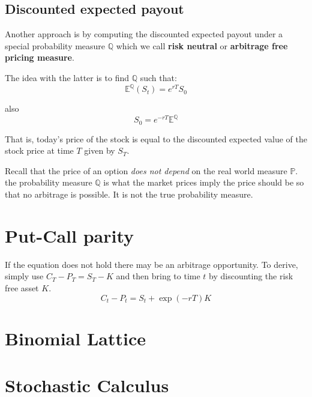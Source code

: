 \documentclass{article}
\begin{document}
\subsection{Discounted expected payout}
Another approach is by computing the discounted expected payout under a special probability measure $\mathbb{Q}$ which we call \textbf{risk neutral} or \textbf{arbitrage free pricing measure}.

The idea with the latter is to find $\mathbb{Q}$ such that:
\[ \mathbb{E}^{\mathbb{Q}}(S_t) = e^{rT}S_0 \]

also 
\[S_0 = e^{-rT}\mathbb{E}^{\mathbb{Q}}\]

That is, today's price of the stock is equal to the discounted expected value of the stock price at time $T$ given by $S_T$.


Recall that the price of an option \textit{does not depend} on the real world measure $\mathbb{P}$. the probability measure $\mathbb{Q}$ is what the market prices imply the price should be so that no arbitrage is possible. It is not the true probability measure. 


\section{Put-Call parity}
If the equation does not hold there may be an arbitrage opportunity. To derive, simply use $C_T - P_T =  S_T -K$ and then bring to time $t$ by discounting the risk free asset $K$. 
\[C_t - P_t = S_t + \exp(-rT)K\]


\section{Binomial Lattice}

\section{Stochastic Calculus}
\end{document}
